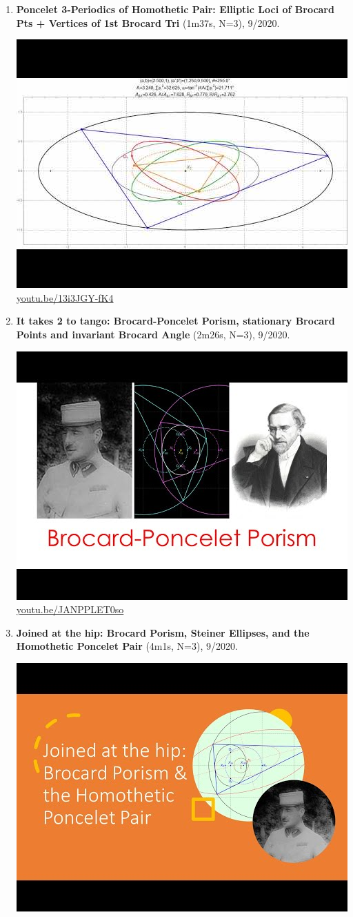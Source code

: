 \documentclass[12pt]{amsart}
\begin{document}
\begin{enumerate}[resume]
\item \textbf{Poncelet 3-Periodics of Homothetic Pair: Elliptic Loci of Brocard Pts + Vertices of 1st Brocard Tri} (1m37s, N=3), 9/2020. 
\begin{center}\includegraphics[width=.5\textwidth]{pics/13i3JGY-fK4.jpg} \\ 
\href{https://youtu.be/13i3JGY-fK4}{\url{youtu.be/13i3JGY-fK4}}\end{center}
% 
\item \textbf{It takes 2 to tango: Brocard-Poncelet Porism, stationary Brocard Points and invariant Brocard Angle} (2m26s, N=3), 9/2020. 
\begin{center}\includegraphics[width=.5\textwidth]{pics/JANPPLET0so.jpg} \\ 
\href{https://youtu.be/JANPPLET0so}{\url{youtu.be/JANPPLET0so}}\end{center}
% 
\item \textbf{Joined at the hip: Brocard Porism, Steiner Ellipses, and the Homothetic Poncelet Pair} (4m1s, N=3), 9/2020. 
\begin{center}\includegraphics[width=.5\textwidth]{pics/h3GZz7pcJp0.jpg} \\ 

\end{center}
\end{enumerate}
\end{document}
